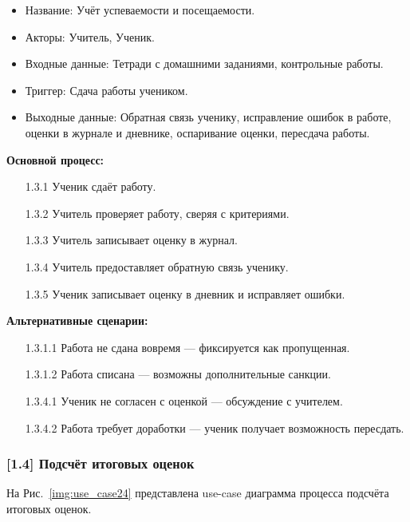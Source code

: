 \documentclass[a4paper, final]{article}
\begin{document}
\begin{itemize}
  \item Название: Учёт успеваемости и посещаемости.
  \item Акторы: Учитель, Ученик.
  \item Входные данные: Тетради с домашними заданиями, контрольные работы.
  \item Триггер: Сдача работы учеником.
  \item Выходные данные: Обратная связь ученику, исправление ошибок в работе, оценки в журнале и дневнике, оспаривание оценки, пересдача работы.
\end{itemize}

\textbf{Основной процесс:}
\begin{enumerate}
  \item[1.3.1] Ученик сдаёт работу.
  \item[1.3.2] Учитель проверяет работу, сверяя с критериями.
  \item[1.3.3] Учитель записывает оценку в журнал.
  \item[1.3.4] Учитель предоставляет обратную связь ученику.
  \item[1.3.5] Ученик записывает оценку в дневник и исправляет ошибки.
\end{enumerate}

\textbf{Альтернативные сценарии:}
\begin{itemize}
  \item[1.3.1.1] Работа не сдана вовремя --- фиксируется как пропущенная.
  \item[1.3.1.2] Работа списана --- возможны дополнительные санкции.
  \item[1.3.4.1] Ученик не согласен с оценкой --- обсуждение с учителем.
  \item[1.3.4.2] Работа требует доработки --- ученик получает возможность пересдать.
\end{itemize}

\subsubsection{[1.4] Подсчёт итоговых оценок}
На Рис.~\ref{img:use_case24} представлена use-case диаграмма процесса подсчёта итоговых оценок.
\end{document}
